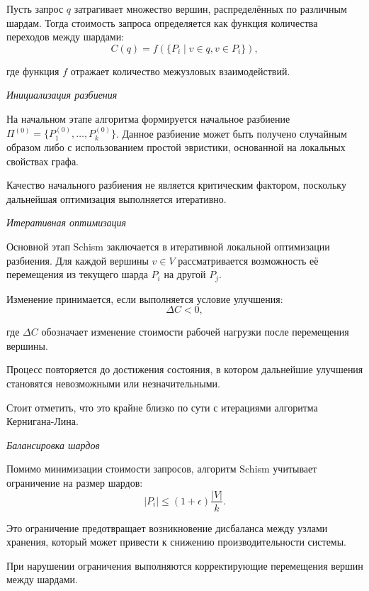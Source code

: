 Пусть запрос $q$ затрагивает множество вершин, распределённых по различным шардам. Тогда стоимость запроса определяется как функция количества переходов между шардами:
\begin{equation*}
C(q) = f(\{P_i \mid v \in q, v \in P_i\}),
\end{equation*}

где функция $f$ отражает количество межузловых взаимодействий.

\textit{Инициализация разбиения}

На начальном этапе алгоритма формируется начальное разбиение $\Pi^{(0)} = \{P_1^{(0)}, \dots, P_k^{(0)}\}$. Данное разбиение может быть получено случайным образом либо с использованием простой эвристики, основанной на локальных свойствах графа.

Качество начального разбиения не является критическим фактором, поскольку дальнейшая оптимизация выполняется итеративно.

\textit{Итеративная оптимизация}

Основной этап Schism заключается в итеративной локальной оптимизации разбиения. Для каждой вершины $v \in V$ рассматривается возможность её перемещения из текущего шарда $P_i$ на другой $P_j$.

Изменение принимается, если выполняется условие улучшения:
\begin{equation*}
\Delta C < 0,
\end{equation*}

где $\Delta C$ обозначает изменение стоимости рабочей нагрузки после перемещения вершины.

Процесс повторяется до достижения состояния, в котором дальнейшие улучшения становятся невозможными или незначительными.

Стоит отметить, что это крайне близко по сути с итерациями алгоритма Кернигана-Лина.

\textit{Балансировка шардов}

Помимо минимизации стоимости запросов, алгоритм Schism учитывает ограничение на размер шардов:
\begin{equation*}
|P_i| \leq (1 + \epsilon)\frac{|V|}{k}.
\end{equation*}

Это ограничение предотвращает возникновение дисбаланса между узлами хранения, который может привести к снижению производительности системы.

При нарушении ограничения выполняются корректирующие перемещения вершин между шардами.

